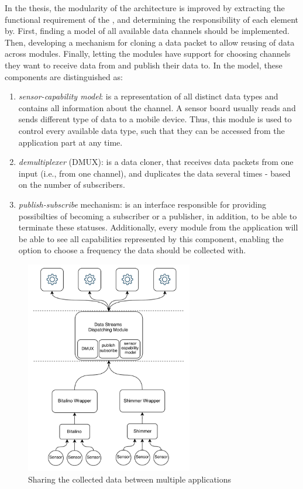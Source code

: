 In the thesis, the modularity of the architecture is improved by extracting the functional requirement of the , and determining the responsibility of each element by. First, finding a model of all available data channels should be implemented. Then, developing a mechanism for cloning a data packet to allow reusing of data across modules. Finally, letting the modules have support for choosing channels they want to receive data from and publish their data to. In the model, these components are distinguished as: 
\begin{enumerate}
    \item \textit{sensor-capability model}: is a representation of all distinct data types and contains all information about the channel. A sensor board usually reads and sends different type of data to a mobile device. Thus, this module is used to control every available data type, such that they can be accessed from the application part at any time.
    \item \textit{demultiplexer} (DMUX): is a data cloner, that receives data packets from one input (i.e., from one channel), and duplicates the data several times - based on the number of subscribers.
    \item \textit{publish-subscribe} mechanism: is an interface responsible for providing possibilties of becoming a subscriber or a publisher, in addition, to be able to terminate these statuses. Additionally, every module from the application will be able to see all capabilities represented by this component, enabling the option to choose a frequency the data should be collected with.
\end{enumerate}

\begin{figure}
    \centering
    \includegraphics[width=0.65\textwidth]{images/demux.png}
    \caption{Sharing the collected data between multiple applications \cite{daniel}}
    \label{fig:demux}
\end{figure}

